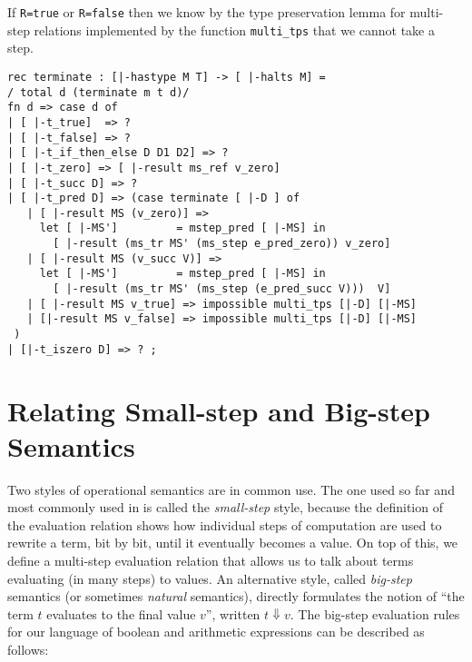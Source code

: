 If \lstinline!R=true! or \lstinline!R=false! then we know by the type
preservation lemma for multi-step relations implemented by the
function \lstinline!multi_tps! that we cannot take a step.



\begin{lstlisting}
rec terminate : [|-hastype M T] -> [ |-halts M] =
/ total d (terminate m t d)/
fn d => case d of
| [ |-t_true]  => ?
| [ |-t_false] => ?
| [ |-t_if_then_else D D1 D2] => ?
| [ |-t_zero] => [ |-result ms_ref v_zero]
| [ |-t_succ D] => ?
| [ |-t_pred D] => (case terminate [ |-D ] of
   | [ |-result MS (v_zero)] =>
     let [ |-MS']         = mstep_pred [ |-MS] in
       [ |-result (ms_tr MS' (ms_step e_pred_zero)) v_zero]
   | [ |-result MS (v_succ V)] =>
     let [ |-MS']         = mstep_pred [ |-MS] in
       [ |-result (ms_tr MS' (ms_step (e_pred_succ V)))  V]
   | [ |-result MS v_true] => impossible multi_tps [|-D] [|-MS] 
   | [|-result MS v_false] => impossible multi_tps [|-D] [|-MS] 
 )
| [|-t_iszero D] => ? ;
\end{lstlisting}


\section{Relating Small-step and Big-step Semantics}


Two styles of operational semantics are in common use. The one used so far and
most commonly used in \cite{TAPL} is called the {\em small-step} style, because the definition of the
evaluation relation shows how individual steps of computation are used to
rewrite a term, bit by bit, until it eventually becomes a value. On top of this,
we define a multi-step evaluation relation that allows us to talk about terms
evaluating (in many steps) to values. An alternative style, called
{\em big-step} semantics (or sometimes {\em natural} semantics), directly
formulates the notion of ``the term $t$ evaluates to the final value $v$'', written
$t \Downarrow v$. The big-step evaluation rules for our language of boolean and
arithmetic expressions can be described as follows:

